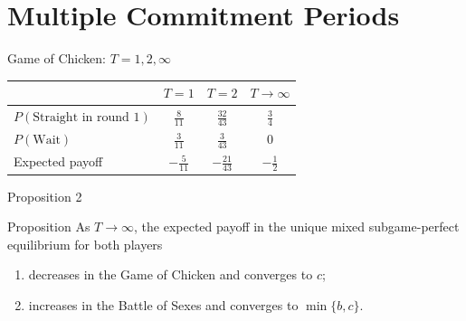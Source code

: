 \documentclass[../slides.tex]{subfiles}
\begin{document}
\section{Multiple Commitment Periods}
\begin{frame}{Game of Chicken: \(T=1,2,\infty\)}
\centering
\renewcommand{\arraystretch}{1.3}
\begin{tabular}{lccc}
\toprule
 & \(T=1\) & \(T=2\) & \(T\to\infty\) \\
\midrule
\(P(\text{Straight in round 1})\) 
  & \(\tfrac{8}{11}\) 
  & \(\tfrac{32}{43}\) 
  & \(\tfrac{3}{4}\) \\[6pt]
\(P(\text{Wait})\) 
  & \(\tfrac{3}{11}\) 
  & \(\tfrac{3}{43}\) 
  & \(0\) \\[6pt]
Expected payoff 
  & \(-\tfrac{5}{11}\) 
  & \(-\tfrac{21}{43}\) 
  & \(-\tfrac{1}{2}\) \\
\bottomrule
\end{tabular}

\end{frame}
\begin{frame}{Proposition 2}
\begin{block}{Proposition}
As \(T \to \infty\), the expected payoff in the unique mixed subgame-perfect equilibrium for both players
\begin{enumerate}
    \item decreases in the Game of Chicken and converges to \(c\);
    \item increases in the Battle of Sexes and converges to \(\min\{b,c\}\).
\end{enumerate}
\end{block}
\end{frame}
\end{document}
